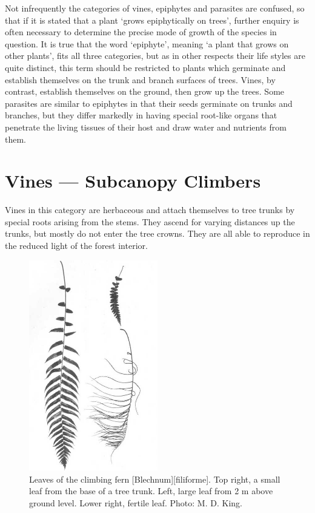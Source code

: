 Not infrequently the categories of vines, epiphytes and parasites are confused, so that if it is stated that a plant `grows epiphytically on trees', further enquiry is often necessary to determine the precise mode of growth of the species in question.
It is true that the word `epiphyte', meaning `a plant that grows on other plants', fits all three categories, but as in other respects their life styles are quite distinct, this term should be restricted to plants which germinate and establish themselves on the trunk and branch surfaces of trees.
Vines, by contrast, establish themselves on the ground, then grow up the trees.
Some parasites are similar to epiphytes in that their seeds germinate on trunks and branches, but they differ markedly in having special root-like organs that penetrate the living tissues of their host and draw water and nutrients from them.

\section{Vines --- Subcanopy Climbers}

Vines in this category are herbaceous and attach themselves to tree trunks by special roots arising from the stems.
They ascend for varying distances up the trunks, but mostly do not enter the tree crowns.
They are all able to reproduce in the reduced light of the forest interior.

\begin{figure}
	\includegraphics[width=0.5\textwidth]{graphics/figure27fern.jpg}
	\centering
	\caption[Leaves of the climbing fern \emph{Blechnum filiforme}]{Leaves of the climbing fern [Blechnum][filiforme].
	Top right, a small leaf from the base of a tree trunk.
	Left, large leaf from 2 m above ground level.
	Lower right, fertile leaf.
	Photo: M. D. King.}%
	\label{fig:27fern}
\end{figure}

